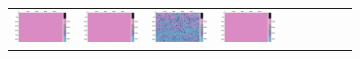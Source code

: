 \documentclass{ipol}
\begin{document}
\begin{figure}[ht]
\begin{subfigure}[t]{\linewidth}
\begin{tabular}{ccccccccc}
                \includegraphics[width=\s]{images/flowers/AHD/bid_64_grids.png}&
                \includegraphics[width=\s]{images/flowers/DCB/bid_64_grids.png}&
                \includegraphics[width=\s]{images/flowers/DHT/bid_64_grids.png}&
                \includegraphics[width=\s]{images/flowers/LINEAR/bid_64_grids.png}&

\end{tabular}
\end{subfigure}
\end{figure}
\end{document}
